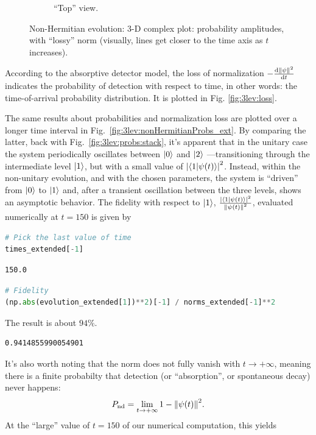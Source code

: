 \begin{figure}[]
\begin{subfigure}[b]{\textwidth}
    \caption{``Top'' view.}
  \end{subfigure}
  \caption{
    Non-Hermitian evolution: 3-D complex plot: probability amplitudes, with ``lossy''
    norm (visually, lines get closer to the time axis as $t$ increases).
  }
  \label{fig:3lev:nonHermitianEvol}
\end{figure}

According to the absorptive detector model, the loss of normalization
$-\dv{\norm{\psi}^2}{t}$ indicates the probability of detection
with respect to time, in other words: the time-of-arrival
probability distribution. It is plotted in Fig. \ref{fig:3lev:loss}.

The same results
about probabilities and normalization loss
are plotted
over a longer time interval
in Fig.~\ref{fig:3lev:nonHermitianProbs_ext}.
By comparing the latter,
back with Fig.~\ref{fig:3lev:probs:stack},
it's apparent that in the unitary case the system
periodically oscillates between $\ket{0}$ and $\ket{2}$
---transitioning through the intermediate level $\ket{1}$,
but with a small value of $\abs{\braket{1}{\psi(t)}}^2$.
Instead, within the non-unitary evolution, and with the chosen parameters,
the system is ``driven'' from $\ket{0}$ to $\ket{1}$ and,
after a transient oscillation between the three levels,
shows an asymptotic behavior.
The fidelity with respect to $\ket{1}$,
$\frac{\abs{\braket{1}{\psi(t)}}^2}{\norm{\psi(t)}^2}$,
evaluated numerically at $t=150$ is given by
\begin{lstlisting}[language=Python]
# Pick the last value of time
times_extended[-1]
\end{lstlisting}
\begin{lstlisting}
150.0
\end{lstlisting}
\begin{lstlisting}[language=Python]
# Fidelity
(np.abs(evolution_extended[1])**2)[-1] / norms_extended[-1]**2
\end{lstlisting}
The result is about $94\%$.
\begin{lstlisting}
0.9414855990054901
\end{lstlisting}
It's also worth noting that the norm does not fully vanish with $t \rightarrow +\infty$,
meaning there is a finite probabilty that detection (or ``absorption'', or spontaneous decay) never happens:
\begin{equation*}
  P_{\mathrm{nd}} = \lim_{t \rightarrow +\infty} 1 - \norm{\psi(t)}^2 \text{.}
\end{equation*}
At the ``large'' value of $t=150$ of our numerical computation, this yields
